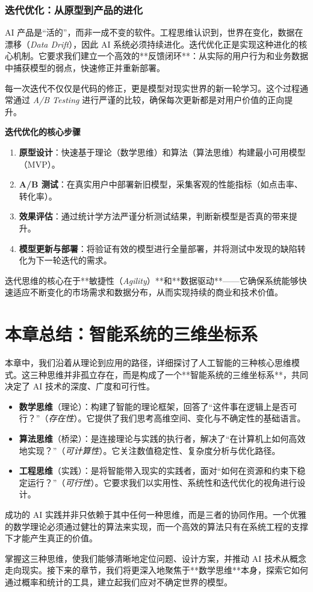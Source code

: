 \subsubsection{迭代优化：从原型到产品的进化}

AI 产品是“活的”，而非一成不变的软件。工程思维认识到，世界在变化，数据在漂移（\textit{Data Drift}），因此 AI 系统必须持续进化。迭代优化正是实现这种进化的核心机制。它要求我们建立一个高效的**反馈闭环**：从实际的用户行为和业务数据中捕获模型的弱点，快速修正并重新部署。

每一次迭代不仅仅是代码的修正，更是模型对现实世界的新一轮学习。这个过程通常通过 \textit{A/B Testing} 进行严谨的比较，确保每次更新都是对用户价值的正向提升。

\textbf{迭代优化的核心步骤}

\begin{enumerate}
    \item \textbf{原型设计}：快速基于理论（数学思维）和算法（算法思维）构建最小可用模型（MVP）。
    \item \textbf{A/B 测试}：在真实用户中部署新旧模型，采集客观的性能指标（如点击率、转化率）。
    \item \textbf{效果评估}：通过统计学方法严谨分析测试结果，判断新模型是否真的带来提升。
    \item \textbf{模型更新与部署}：将验证有效的模型进行全量部署，并将测试中发现的缺陷转化为下一轮迭代的需求。
\end{enumerate}

迭代思维的核心在于**敏捷性（\textit{Agility}）**和**数据驱动**——它确保系统能够快速适应不断变化的市场需求和数据分布，从而实现持续的商业和技术价值。

\section{本章总结：智能系统的三维坐标系}

本章中，我们沿着从理论到应用的路径，详细探讨了人工智能的三种核心思维模式。这三种思维并非孤立存在，而是构成了一个**智能系统的三维坐标系**，共同决定了 AI 技术的深度、广度和可行性。

\begin{itemize}
    \item \textbf{数学思维}（理论）：构建了智能的理论框架，回答了“这件事在逻辑上是否可行？”（\textit{存在性}）。它提供了我们思考高维空间、变化与不确定性的基础语言。
    \item \textbf{算法思维}（桥梁）：是连接理论与实践的执行者，解决了“在计算机上如何高效地实现？”（\textit{可计算性}）。它关注数值稳定性、复杂度分析与优化路径。
    \item \textbf{工程思维}（实践）：是将智能带入现实的实践者，面对“如何在资源和约束下稳定运行？”（\textit{可行性}）。它要求我们以实用性、系统性和迭代优化的视角进行设计。
\end{itemize}

成功的 AI 实践并非只依赖于其中任何一种思维，而是三者的协同作用。一个优雅的数学理论必须通过健壮的算法来实现，而一个高效的算法只有在系统工程的支撑下才能产生真正的价值。

掌握这三种思维，使我们能够清晰地定位问题、设计方案，并推动 AI 技术从概念走向现实。接下来的章节，我们将更深入地聚焦于**数学思维**本身，探索它如何通过概率和统计的工具，建立起我们应对不确定世界的模型。